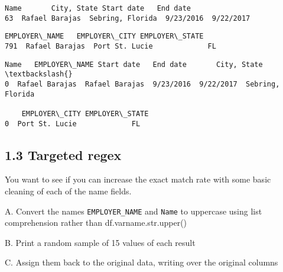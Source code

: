 \documentclass[11pt]{article}
\makeatletter
\newcommand{\boxspacing}{\kern\kvtcb@left@rule\kern\kvtcb@boxsep}
\newcommand{\prompt}[4]{
        {\ttfamily\llap{{\color{#2}[#3]:\hspace{3pt}#4}}\vspace{-\baselineskip}}
    }
\makeatother
\begin{document}
            \begin{tcolorbox}[breakable, size=fbox, boxrule=.5pt, pad at break*=1mm, opacityfill=0]
\prompt{Out}{outcolor}{167}{\boxspacing}
\begin{Verbatim}[commandchars=\\\{\}]
              Name       City, State Start date   End date
63  Rafael Barajas  Sebring, Florida  9/23/2016  9/22/2017
\end{Verbatim}
\end{tcolorbox}
        
            \begin{tcolorbox}[breakable, size=fbox, boxrule=.5pt, pad at break*=1mm, opacityfill=0]
\prompt{Out}{outcolor}{167}{\boxspacing}
\begin{Verbatim}[commandchars=\\\{\}]
      EMPLOYER\_NAME   EMPLOYER\_CITY EMPLOYER\_STATE
791  Rafael Barajas  Port St. Lucie             FL
\end{Verbatim}
\end{tcolorbox}
        
            \begin{tcolorbox}[breakable, size=fbox, boxrule=.5pt, pad at break*=1mm, opacityfill=0]
\prompt{Out}{outcolor}{167}{\boxspacing}
\begin{Verbatim}[commandchars=\\\{\}]
             Name   EMPLOYER\_NAME Start date   End date       City, State  \textbackslash{}
0  Rafael Barajas  Rafael Barajas  9/23/2016  9/22/2017  Sebring, Florida

    EMPLOYER\_CITY EMPLOYER\_STATE
0  Port St. Lucie             FL
\end{Verbatim}
\end{tcolorbox}
        
    \hypertarget{targeted-regex}{%
\subsection{1.3 Targeted regex}\label{targeted-regex}}

You want to see if you can increase the exact match rate with some basic
cleaning of each of the name fields.

    A. Convert the names \texttt{EMPLOYER\_NAME} and \texttt{Name} to
uppercase using list comprehension rather than df.varname.str.upper()

B. Print a random sample of 15 values of each result

C. Assign them back to the original data, writing over the original
columns
\end{document}
